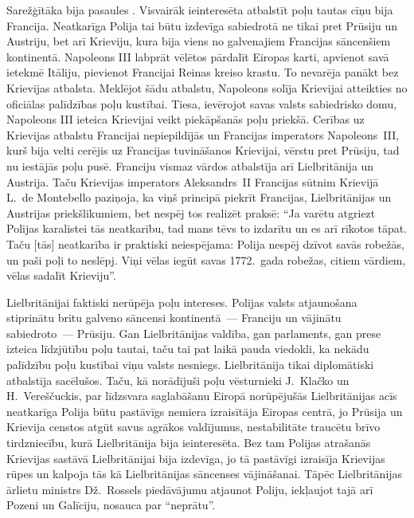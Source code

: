 \documentclass[twoside,a5paper,12pt,fleqn,openany]{extbook}
\begin{document}
Sarežģītāka bija pasaules . Visvairāk ieinteresēta atbalstīt poļu tautas cīņu bija Francija. Neatkarīga Polija tai būtu izdevīga sabiedrotā ne tikai pret Prūsiju un Austriju, bet arī Krieviju, kura bija viens no galvenajiem Francijas sāncenšiem kontinentā. Napoleons III labprāt vēlētos pārdalīt Eiropas karti, apvienot savā ietekmē Itāliju, pievienot Francijai Reinas kreiso krastu. To nevarēja panākt bez Krievijas atbalsta. Meklējot šādu atbalstu, Napoleons solīja Krievijai atteikties no oficiālas palīdzības poļu kustībai. Tiesa, ievērojot savas valsts sabiedrisko domu, Napoleons III ieteica Krievijai veikt piekāpšanās poļu priekšā. Cerības uz Krievijas atbalstu Francijai nepiepildījās un Francijas imperators Napoleons~III, kurš bija velti cerējis uz Francijas tuvināšanos Krievijai, vērstu pret Prūsiju, tad nu iestājās poļu pusē. Franciju vismaz vārdos atbalstīja arī Lielbritānija un Austrija. Taču Krievijas imperators Aleksandrs~II Francijas sūtnim Krievijā L.~de Montebello paziņoja, ka viņš principā piekrīt Francijas, Lielbritānijas un Austrijas priekšlikumiem, bet nespēj tos realizēt praksē: ``Ja varētu atgriezt Polijas karalistei tās neatkarību, tad mans tēvs to izdarītu un es arī rīkotos tāpat. Taču [tās] neatkarība ir praktiski neiespējama: Polija nespēj dzīvot savās robežās, un paši poļi to neslēpj. Viņi vēlas iegūt savas 1772.~gada robežas, citiem vārdiem, vēlas sadalīt Krieviju''.

Lielbritānijai faktiski nerūpēja poļu intereses. Polijas valsts atjaunošana stiprinātu britu galveno sāncensi kontinentā~--- Franciju un vājinātu sabiedroto~--- Prūsiju. Gan Lielbritānijas valdība, gan parlaments, gan prese izteica līdzjūtību poļu tautai, taču tai pat laikā pauda viedokli, ka nekādu palīdzību poļu kustībai viņu valsts nesniegs. Lielbritānija tikai diplomātiski atbalstīja sacēlušos. Taču, kā norādījuši poļu vēsturnieki J.~Klačko un H.~Vereščuckis, par līdzsvara saglabāšanu Eiropā norūpējušās Lielbritānijas acīs neatkarīga Polija būtu pastāvīgs nemiera izraisītāja Eiropas centrā, jo Prūsija un Krievija censtos atgūt savus agrākos valdījumus, nestabilitāte traucētu brīvo tirdzniecību, kurā Lielbritānija bija ieinteresēta. Bez tam Polijas atrašanās Krievijas sastāvā Lielbritānijai bija izdevīga, jo tā pastāvīgi izraisīja Krievijas rūpes un kalpoja tās kā Lielbritānijas sāncenses vājināšanai. Tāpēc Lielbritānijas ārlietu ministrs Dž.~Rossels piedāvājumu atjaunot Poliju, iekļaujot tajā arī Pozeni un Galīciju, nosauca par ``neprātu''.
\end{document}
